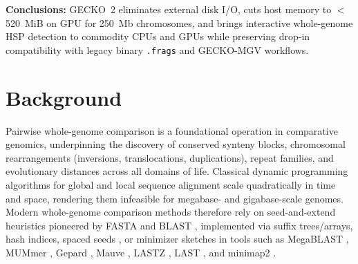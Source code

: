 \documentclass[pdflatex,sn-vancouver,Numbered]{sn-jnl}
\begin{document}
{\textbf{Conclusions:} GECKO~2 eliminates external disk I/O, cuts host memory to $<$520~MiB on GPU for 250~Mb chromosomes, and brings interactive whole-genome HSP detection to commodity CPUs and GPUs while preserving drop-in compatibility with legacy binary \texttt{.frags} and GECKO-MGV workflows.}


\maketitle

\section{Background}\label{sec:background}

Pairwise whole-genome comparison is a foundational operation in comparative genomics, underpinning the discovery of conserved synteny blocks, chromosomal rearrangements (inversions, translocations, duplications), repeat families, and evolutionary distances across all domains of life. Classical dynamic programming algorithms for global \cite{needleman1970} and local \cite{smith1981} sequence alignment scale quadratically in time and space, rendering them infeasible for megabase- and gigabase-scale genomes. Modern whole-genome comparison methods therefore rely on seed-and-extend heuristics pioneered by FASTA \cite{pearson1988fasta} and BLAST \cite{altschul1990blast,altschul1997gappedblast}, implemented via suffix trees/arrays, hash indices, spaced seeds \cite{ma2002patternhunter}, or minimizer sketches \cite{roberts2004minimizers} in tools such as MegaBLAST \cite{zhang2000megablast}, MUMmer \cite{kurtz2004mummer,marcais2018mummer4}, Gepard \cite{krumsiek2007gepard}, Mauve \cite{darling2004mauve}, LASTZ \cite{harris2007lastz}, LAST \cite{kielbasa2011last}, and minimap2 \cite{li2018minimap2}.
\end{document}
